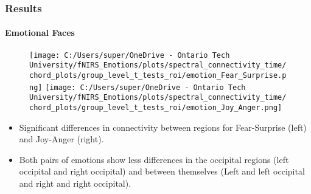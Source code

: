 \documentclass{beamer}
\begin{document}
\begin{frame}
    \frametitle{Results}
    \framesubtitle{Emotional Faces}
    \begin{figure}
        \centering
        \texttt{[image: C:/Users/super/OneDrive - Ontario Tech University/fNIRS\_Emotions/plots/spectral\_connectivity\_time/chord\_plots/group\_level\_t\_tests\_roi/emotion\_Fear\_Surprise.png]}
        \texttt{[image: C:/Users/super/OneDrive - Ontario Tech University/fNIRS\_Emotions/plots/spectral\_connectivity\_time/chord\_plots/group\_level\_t\_tests\_roi/emotion\_Joy\_Anger.png]}
    \end{figure}
    \begin{itemize}
        \small
        \item Significant differences in connectivity between regions for Fear-Surprise (left) and Joy-Anger (right).
        \item Both pairs of emotions show less differences in the occipital regions (left occipital and right occipital) and between themselves (Left and left occipital and right and right occipital).
    \end{itemize}
\end{frame}
\end{document}
